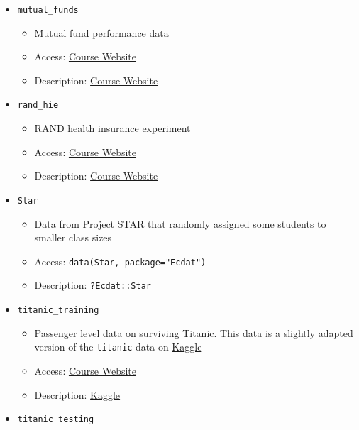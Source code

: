 \documentclass[
  letterpaper,
  DIV=11,
  numbers=noendperiod]{scrreprt}
\begin{document}
\begin{itemize}
  \begin{itemize}
  \item
    Labor force particpation of married women
  \item
    Access: \texttt{data(mroz,\ package="wooldridge")}
  \item
    Description: \texttt{?wooldridge::mroz}
  \end{itemize}
\item
  \texttt{mutual\_funds}

  \begin{itemize}
  \item
    Mutual fund performance data
  \item
    Access: \href{\%60r\%20course_website_link\%60}{Course Website}
  \item
    Description: \href{\%60r\%20course_website_link\%60}{Course Website}
  \end{itemize}
\item
  \texttt{rand\_hie}

  \begin{itemize}
  \item
    RAND health insurance experiment
  \item
    Access: \href{\%60r\%20course_website_link\%60}{Course Website}
  \item
    Description: \href{\%60r\%20course_website_link\%60}{Course Website}
  \end{itemize}
\item
  \texttt{Star}

  \begin{itemize}
  \item
    Data from Project STAR that randomly assigned some students to
    smaller class sizes
  \item
    Access: \texttt{data(Star,\ package="Ecdat")}
  \item
    Description: \texttt{?Ecdat::Star}
  \end{itemize}
\item
  \texttt{titanic\_training}

  \begin{itemize}
  \item
    Passenger level data on surviving Titanic. This data is a slightly
    adapted version of the \texttt{titanic} data on
    \href{https://www.kaggle.com/c/titanic}{Kaggle}
  \item
    Access: \href{\%60r\%20course_website_link\%60}{Course Website}
  \item
    Description: \href{https://www.kaggle.com/c/titanic/data}{Kaggle}
  \end{itemize}
\item
  \texttt{titanic\_testing}


\end{itemize}
\end{document}
